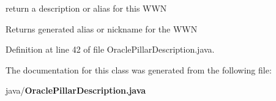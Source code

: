 return a description or alias for this W\-W\-N 

\begin{DoxyReturn}{Returns}
generated alias or nickname for the W\-W\-N 
\end{DoxyReturn}


Definition at line 42 of file Oracle\-Pillar\-Description.\-java.



The documentation for this class was generated from the following file\-:\begin{DoxyCompactItemize}
\item 
java/{\bf Oracle\-Pillar\-Description.\-java}\end{DoxyCompactItemize}
